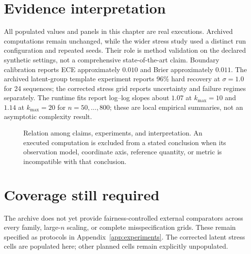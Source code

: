 \section{Evidence interpretation}
All populated values and panels in this chapter are real executions. Archived computations remain
unchanged, while the wider stress study used a distinct run configuration and repeated seeds.
Their role is method validation on the declared synthetic settings, not a comprehensive
state-of-the-art claim.
Boundary calibration reports ECE approximately $0.010$ and Brier approximately $0.011$. The
archived latent-group template experiment reports 96\% hard recovery at $\sigma=1.0$ for 24
sequences; the corrected stress grid reports uncertainty and failure regimes separately.
The runtime fits report log--log slopes about $1.07$ at $k_{\max}=10$ and $1.14$ at
$k_{\max}=20$ for $n=50,\ldots,800$; these are local empirical summaries, not an asymptotic
complexity result.

\begin{figure}[H]
\centering
\resizebox{0.96\textwidth}{!}{}
\caption{Relation among claims, experiments, and interpretation. An executed computation is excluded from a stated conclusion when its observation model, coordinate axis, reference quantity, or metric is incompatible with that conclusion.}
\label{fig:claim-experiment-map}
\end{figure}

\section{Coverage still required}
The archive does not yet provide fairness-controlled external comparators across every family,
large-$n$ scaling, or complete misspecification grids. These remain specified as protocols in
Appendix~\ref{app:experiments}. The corrected latent stress cells are populated here; other planned
cells remain explicitly unpopulated.
